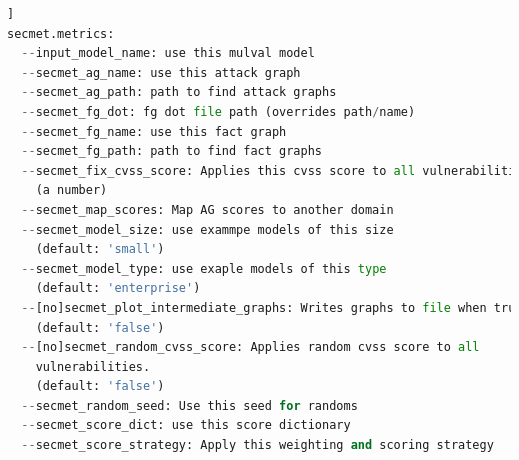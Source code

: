 \begin{lstlisting}[language=Python, label={lst:secmet_flags}, caption={SecMet CLI Flags},captionpos=b,]]
secmet.metrics:
  --input_model_name: use this mulval model
  --secmet_ag_name: use this attack graph
  --secmet_ag_path: path to find attack graphs
  --secmet_fg_dot: fg dot file path (overrides path/name)
  --secmet_fg_name: use this fact graph
  --secmet_fg_path: path to find fact graphs
  --secmet_fix_cvss_score: Applies this cvss score to all vulnerabilities.
    (a number)
  --secmet_map_scores: Map AG scores to another domain
  --secmet_model_size: use exammpe models of this size
    (default: 'small')
  --secmet_model_type: use exaple models of this type
    (default: 'enterprise')
  --[no]secmet_plot_intermediate_graphs: Writes graphs to file when true.
    (default: 'false')
  --[no]secmet_random_cvss_score: Applies random cvss score to all
    vulnerabilities.
    (default: 'false')
  --secmet_random_seed: Use this seed for randoms
  --secmet_score_dict: use this score dictionary
  --secmet_score_strategy: Apply this weighting and scoring strategy
  \end{lstlisting}



